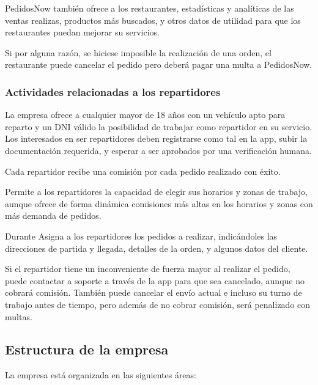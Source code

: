 PedidosNow también ofrece a los restaurantes, estadísticas y analíticas de las ventas realizas, productos más buscados, y otros datos de utilidad para que los restaurantes puedan mejorar su servicios.

Si por alguna razón, se hiciese imposible la realización de una orden, el restaurante puede cancelar el pedido pero deberá pagar una multa a PedidosNow.

\subsubsection{Actividades relacionadas a los repartidores}

La empresa ofrece a cualquier mayor de 18 años con un vehículo apto para reparto y un DNI válido la posibilidad de trabajar como repartidor en su servicio. Los interesados en ser repartidores deben registrarse como tal en la app, subir la documentación requerida, y esperar a ser aprobados por una verificación humana.

Cada repartidor recibe una comisión por cada pedido realizado con éxito.

Permite a los repartidores la capacidad de elegir sus horarios y zonas de trabajo, aunque ofrece de forma dinámica comisiones más altas en los horarios y zonas con más demanda de pedidos.

Durante Asigna a los repartidores los pedidos a realizar, indicándoles las direcciones de partida y llegada, detalles de la orden, y algunos datos del cliente.

Si el repartidor tiene un inconveniente de fuerza mayor al realizar el pedido, puede contactar a soporte a través de la app para que sea cancelado, aunque no cobrará comisión. También puede cancelar el envío actual e incluso su turno de trabajo antes de tiempo, pero además de no cobrar comisión, será penalizado con multas.


\subsection{Estructura de la empresa}

La empresa está organizada en las siguientes áreas:

